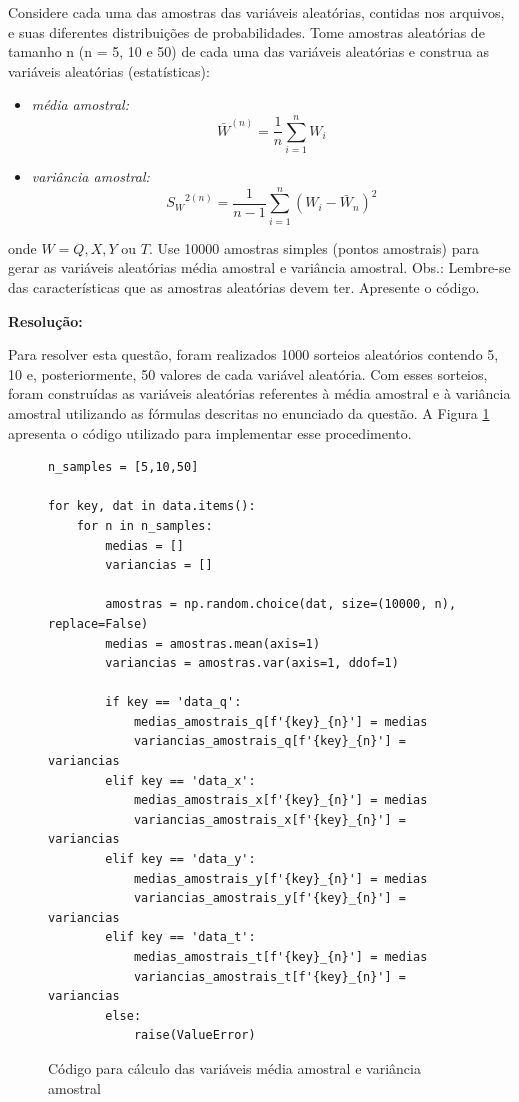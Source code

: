 \documentclass[a4paper, 11pt]{article}
\begin{document}
\noindent Considere cada uma das amostras das variáveis aleatórias, contidas nos arquivos, e suas diferentes distribuições de probabilidades. Tome amostras aleatórias de tamanho n (n = 5, 10 e 50) de cada uma das variáveis aleatórias e construa as variáveis aleatórias (estatísticas):

\begin{itemize}
    \item \textit{média amostral:} \[{\bar{W}}^{(n)}=\dfrac{1}{n} \sum_{i=1}^{n} W_i\]
    \item \textit{variância amostral:} \[{S_W}^{2(n)}=\dfrac{1}{n-1} \sum_{i=1}^{n}(W_i - \bar{W}_n)^2\]
\end{itemize}

onde $W = Q, X, Y$ ou $T$. Use 10000 amostras simples (pontos amostrais) para gerar
as variáveis aleatórias média amostral e variância amostral. Obs.: Lembre-se das
características que as amostras aleatórias devem ter. Apresente o código.

\textbf{Resolução:}

Para resolver esta questão, foram realizados 1000 sorteios aleatórios contendo 5, 10 e, posteriormente, 50 valores de cada variável aleatória. Com esses sorteios, foram construídas as variáveis aleatórias referentes à média amostral e à variância amostral utilizando as fórmulas descritas no enunciado da questão. A Figura \ref{fig:cod} apresenta o código utilizado para implementar esse procedimento.

\begin{figure}[H]
    \centering
    \begin{minipage}{\textwidth}
    \begin{lstlisting}
n_samples = [5,10,50]
        
for key, dat in data.items():
    for n in n_samples:
        medias = []
        variancias = []
        
        amostras = np.random.choice(dat, size=(10000, n), replace=False)
        medias = amostras.mean(axis=1)
        variancias = amostras.var(axis=1, ddof=1)
        
        if key == 'data_q':
            medias_amostrais_q[f'{key}_{n}'] = medias
            variancias_amostrais_q[f'{key}_{n}'] = variancias
        elif key == 'data_x':
            medias_amostrais_x[f'{key}_{n}'] = medias
            variancias_amostrais_x[f'{key}_{n}'] = variancias
        elif key == 'data_y':
            medias_amostrais_y[f'{key}_{n}'] = medias
            variancias_amostrais_y[f'{key}_{n}'] = variancias
        elif key == 'data_t':
            medias_amostrais_t[f'{key}_{n}'] = medias
            variancias_amostrais_t[f'{key}_{n}'] = variancias
        else:
            raise(ValueError)
    \end{lstlisting}   
    \end{minipage} 
    \caption{Código para cálculo das variáveis média amostral e variância amostral}
    \label{fig:cod}
\end{figure}
\end{document}
